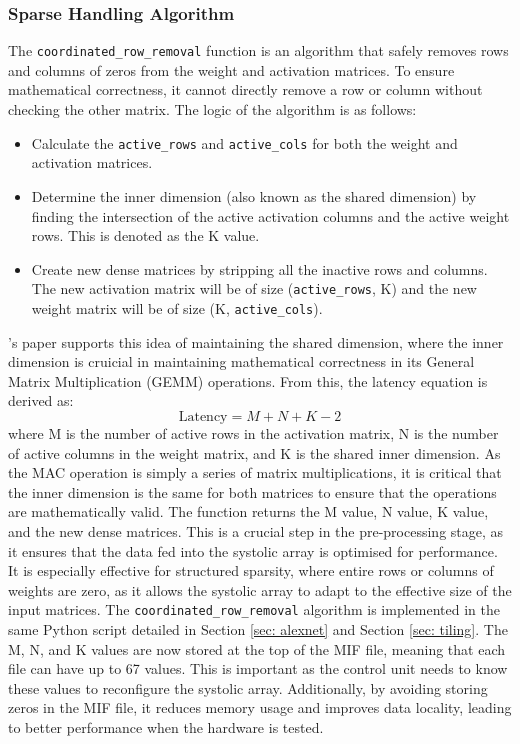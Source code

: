 \documentclass[12pt, a4paper, ukenglish]{article}
\begin{document}
            
    \subsubsection{Sparse Handling Algorithm} \label{sec: sparse handling algo}
    The \texttt{coordinated\_row\_removal} function is an algorithm that safely removes rows and columns of zeros from the weight and activation matrices. To ensure mathematical correctness, it cannot directly remove a row or column without checking the other matrix. The logic of the algorithm is as follows:
    \begin{itemize}
        \item Calculate the \texttt{active\_rows} and \texttt{active\_cols} for both the weight and activation matrices.
        \item Determine the inner dimension (also known as the shared dimension) by finding the intersection of the active activation columns and the active weight rows. This is denoted as the K value. 
        \item Create new dense matrices by stripping all the inactive rows and columns. The new activation matrix will be of size (\texttt{active\_rows}, K) and the new weight matrix will be of size (K, \texttt{active\_cols}).
    \end{itemize}
    \textcite{qin_sigma_2020}'s paper supports this idea of maintaining the shared dimension, where the inner dimension is cruicial in maintaining mathematical correctness in its General Matrix Multiplication (GEMM) operations. From this, the latency equation is derived as:
    \begin{equation} \label{eq: latency}
        \text{Latency} = M + N + K - 2
    \end{equation}
    where M is the number of active rows in the activation matrix, N is the number of active columns in the weight matrix, and K is the shared inner dimension.
    As the MAC operation is simply a series of matrix multiplications, it is critical that the inner dimension is the same for both matrices to ensure that the operations are mathematically valid. The function returns the M value, N value, K value, and the new dense matrices. This is a crucial step in the pre-processing stage, as it ensures that the data fed into the systolic array is optimised for performance. It is especially effective for structured sparsity, where entire rows or columns of weights are zero, as it allows the systolic array to adapt to the effective size of the input matrices. 
    The \texttt{coordinated\_row\_removal} algorithm is implemented in the same Python script detailed in Section \ref{sec: alexnet} and Section \ref{sec: tiling}. The M, N, and K values are now stored at the top of the MIF file, meaning that each file can have up to 67 values. This is important as the control unit needs to know these values to reconfigure the systolic array. Additionally, by avoiding storing zeros in the MIF file, it reduces memory usage and improves data locality, leading to better performance when the hardware is tested.
\end{document}
